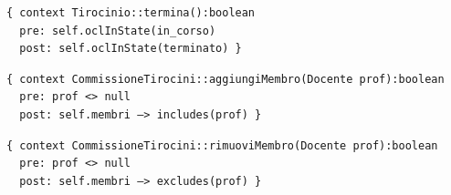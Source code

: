 \documentclass[12pt]{article}
\begin{document}
\begin{verbatim}
{ context Tirocinio::termina():boolean
  pre: self.oclInState(in_corso)
  post: self.oclInState(terminato) }
\end{verbatim}

\begin{verbatim}
{ context CommissioneTirocini::aggiungiMembro(Docente prof):boolean
  pre: prof <> null
  post: self.membri —> includes(prof) }
\end{verbatim}

\begin{verbatim}
{ context CommissioneTirocini::rimuoviMembro(Docente prof):boolean
  pre: prof <> null
  post: self.membri —> excludes(prof) }
\end{verbatim}
\end{document}
